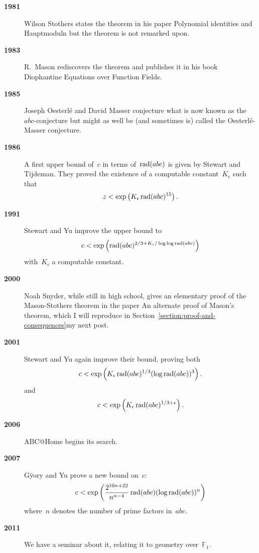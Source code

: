\begin{description}
  \item[\textbf{1981}] Wilson Stothers states the theorem in his paper Polynomial identities and Hauptmoduln but the theorem is not remarked upon.
  \item[\textbf{1983}] R.\ Mason rediscovers the theorem and publishes it in his book Diophantine Equations over Function Fields.
  \item[\textbf{1985}] Joseph Oesterl\'e and David Masser conjecture what is now known as the~$abc$\nobreakdash-conjecture but might as well be (and sometimes is) called the Oesterl\'e-Masser conjecture.

  \item[\textbf{1986}] A first upper bound of~$c$ in terms of~$\operatorname{rad}(abc)$ is given by Stewart and Tijdeman. They proved the existence of a computable constant~$K_{\epsilon}$ such that
    \begin{equation}
      z<\exp\left( K_{\epsilon}\operatorname{rad}(abc)^{15} \right).
    \end{equation}
  \item[\textbf{1991}] Stewart and Yu improve the upper bound to
    \begin{equation}
      c<\exp\left( \operatorname{rad}(abc)^{2/3+K_{\epsilon}/\log\log\operatorname{rad}(abc)} \right)
    \end{equation}
    with~$K_{\epsilon}$ a computable constant.
  \item[\textbf{2000}] Noah Snyder, while still in high school, gives an elementary proof of the Mason-Stothers theorem in the paper An alternate proof of Mason's theorem, which I will reproduce in \iftex Section~\ref{section:proof-and-consequences}\fi\ifblog my next post\fi.
  \item[\textbf{2001}] Stewart and Yu again improve their bound, proving both
    \begin{equation}
      c<\exp\left( K_{\epsilon}\operatorname{rad}(abc)^{1/3}(\log\operatorname{rad}(abc))^3 \right).
    \end{equation}
    and
    \begin{equation}
      c<\exp\left( K_{\epsilon}\operatorname{rad}(abc)^{1/3+\epsilon} \right).
    \end{equation}
  \item[\textbf{2006}] ABC@Home begins its search.

  \item[\textbf{2007}] G\"yory and Yu prove a new bound on~$c$:
    \begin{equation}
      c<\exp\left( \frac{2^{10n+22}}{n^{n-4}}\operatorname{rad}(abc)(\log\operatorname{rad}(abc))^n \right)
    \end{equation}
    where~$n$ denotes the number of prime factors in~$abc$.
  \item[\textbf{2011}] We have a seminar about it, relating it to geometry over~$\mathbb{F}_1$.
\end{description}
